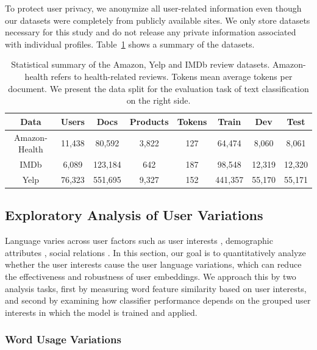 To protect user privacy, we anonymize all user-related information even though our datasets were completely from publicly available sites. 
We only store datasets necessary for this study and do not release any private information associated with individual profiles.
Table~\ref{chap4:tab:data2} shows a summary of the datasets.


\begin{table}[htp]
\centering
    \begin{tabular}{c||cccc||ccc}
    Data & Users & Docs & Products & Tokens & Train & Dev & Test \\\hline\hline
    Amazon-Health & 11,438 & 80,592 & 3,822 & 127 & 64,474 & 8,060 & 8,061 \\
    IMDb & 6,089 & 123,184 & 642 & 187 & 98,548 & 12,319 & 12,320 \\
    Yelp & 76,323 & 551,695 & 9,327 & 152 & 441,357 & 55,170 & 55,171 \\
    \end{tabular}
\caption{Statistical summary of the Amazon, Yelp and IMDb review datasets. Amazon-health refers to health-related reviews. Tokens mean average tokens per document. We present the data split for the evaluation task of text classification on the right side.}
\label{chap4:tab:data2}
\end{table}



\subsection{Exploratory Analysis of User Variations}

Language varies across user factors such as user interests \cite{oba2019modeling}, demographic attributes \cite{huang2019neuraluser}, social relations \cite{yang2017overcoming}.
In this section, our goal is to quantitatively analyze whether the user interests cause the user language variations, which can reduce the effectiveness and robustness of user embeddings.
We approach this by two analysis tasks, first by measuring word feature similarity based on user interests, and second by examining how classifier performance depends on the grouped user interests in which the model is trained and applied.



\subsubsection{Word Usage Variations}

